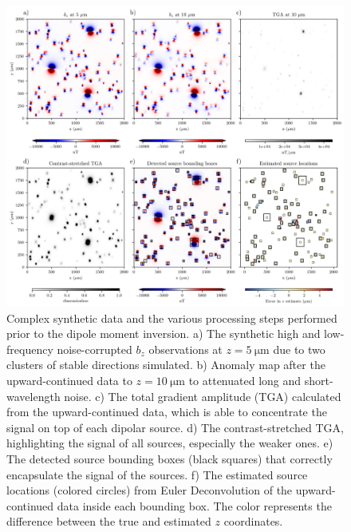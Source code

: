 \begin{figure}[tb!]
  \centering
  \includegraphics[width=1\linewidth]{figures/complex-synthetic-data.png}
  \caption{
    Complex synthetic data and the various processing steps performed prior to the dipole moment inversion.
    a) The synthetic high and low-frequency noise-corrupted $b_z$ observations at
    $z = \qty{5}{\micro\meter}$ due to two clusters of stable directions simulated.
    b) Anomaly map after the upward-continued data to $z = \qty{10}{\micro\meter}$ to attenuated long and short-wavelength noise.
    c) The total gradient amplitude (TGA) calculated from the
    upward-continued data, which is able to concentrate the signal on top
    of each dipolar source.
    d) The contrast-stretched TGA, highlighting the signal of all sources, especially the weaker ones.
    e) The detected source bounding boxes (black squares) that correctly
    encapsulate the signal of the sources.
    f) The estimated source locations (colored circles) from Euler
    Deconvolution of the upward-continued data inside each bounding box.
    The color represents the difference between the true and estimated
    $z$ coordinates.
  }
  \label{complex-synthetic-data}
\end{figure}

